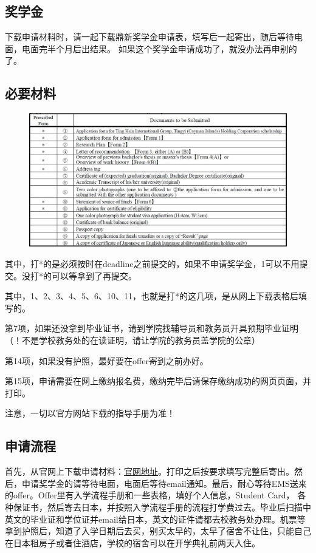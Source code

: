 \subsection{奖学金}
下载申请材料时，请一起下载鼎新奖学金申请表，填写后一起寄出，随后等待电面，电面完半个月后出结果。
如果这个奖学金申请成功了，就没办法再申别的了。

\subsection{必要材料}
\begin{figure}[htbp]
\centering
\includegraphics[width=12cm]{5allworld/cite.eps}
\end{figure}\par

其中，打*的是必须按时在deadline之前提交的，如果不申请奖学金，1可以不用提交。没打*的可以等拿到了再提交。\par
其中，1、2、3、4、5、6、10、11，也就是打*的这几项，是从网上下载表格后填写的。\par
第7项，如果还没拿到毕业证书，请到学院找辅导员和教务员开具预期毕业证明（！不是学校教务处的在读证明，请让学院的教务员盖学院的公章）\par
第14项，如果没有护照，最好要在offer寄到之前办好。\par
第15项，申请需要在网上缴纳报名费，缴纳完毕后请保存缴纳成功的网页页面，并打印。\par
注意，一切以官方网站下载的指导手册为准！

\subsection{申请流程}
首先，从官网上下载申请材料：\href{http://www.waseda.jp/ips/english/index.html}{官网地址}。打印之后按要求填写完整后寄出。然后，申请奖学金的请等待电面，电面后等待email通知。最后，耐心等待EMS送来的offer。Offer里有入学流程手册和一些表格，填好个人信息，Student Card， 各种保证书，然后寄去日本，并按照入学流程手册的流程打学费过去。毕业后扫描中英文的毕业证和学位证并email给日本，英文的证件请都去校教务处办理。机票等拿到护照后，知道了入学日期后去买，别买太早的，太早了宿舍不让住，只能自己在日本租房子或者住酒店，学校的宿舍可以在开学典礼前两天入住。

